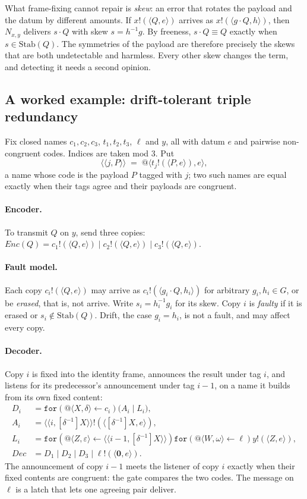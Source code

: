 \documentclass[11pt]{article}
\makeatletter
\theoremstyle{definition}
\theoremstyle{remark}
\newcommand{\nil}{\mathbf{0}}
\newcommand{\rcv}[3]{\mathtt{for}(#1 \leftarrow #2)#3}
\newcommand{\out}[3]{#1!(\langle #2, #3\rangle)}
\newcommand{\qn}[2]{@\langle #1, #2\rangle}
\newcommand{\act}[2]{#1\cdot #2}
\newcommand{\scong}{\equiv}
\newcommand{\Stab}{\mathrm{Stab}}
\newcommand{\fr}[2]{[#1]#2}
\makeatother
\begin{document}
What frame-fixing cannot repair is \emph{skew}: an error that rotates the
payload and the datum by different amounts. If $\out{x}{Q}{e}$ arrives as
$\out{x}{\act{g}{Q}}{h}$, then $N_{x,y}$ delivers $\act{s}{Q}$ with skew
$s=h^{-1}g$. By freeness, $\act{s}{Q}\scong Q$ exactly when $s\in\Stab(Q)$.
The symmetries of the payload are therefore precisely the skews that are
both undetectable and harmless. Every other skew changes the term, and
detecting it needs a second opinion.

\subsection{A worked example: drift-tolerant triple redundancy}

Fix closed names $c_1,c_2,c_3$, $t_1,t_2,t_3$, $\ell$ and $y$, all with datum
$e$ and pairwise non-congruent codes. Indices are taken mod $3$. Put
\[
\langle\!\langle j,P\rangle\!\rangle \;=\; \qn{\out{t_j}{P}{e}}{e},
\]
a name whose code is the payload $P$ tagged with $j$; two such names are
equal exactly when their tags agree and their payloads are congruent.

\paragraph{Encoder.}
To transmit $Q$ on $y$, send three copies:
$\mathit{Enc}(Q)=\out{c_1}{Q}{e}\mid\out{c_2}{Q}{e}\mid\out{c_3}{Q}{e}$.

\paragraph{Fault model.}
Each copy $\out{c_i}{Q}{e}$ may arrive as $\out{c_i}{\act{g_i}{Q}}{h_i}$ for
arbitrary $g_i,h_i\in G$, or be \emph{erased}, that is, not arrive. Write
$s_i=h_i^{-1}g_i$ for its skew. Copy $i$ is \emph{faulty} if it is erased or
$s_i\notin\Stab(Q)$. Drift, the case $g_i=h_i$, is not a fault, and may
affect every copy.

\paragraph{Decoder.}
Copy $i$ is fixed into the identity frame, announces the result under tag
$i$, and listens for its predecessor's announcement under tag $i-1$, on a
name it builds from its own fixed content:
\begin{align*}
D_i &= \rcv{\qn{X}{\delta}}{c_i}{\bigl(A_i\mid L_i\bigr)},\\
A_i &= \out{\langle\!\langle i,\fr{\delta^{-1}}{X}\rangle\!\rangle}
           {\fr{\delta^{-1}}{X}}{e},\\
L_i &= \rcv{\qn{Z}{\varepsilon}}
           {\langle\!\langle i-1,\fr{\delta^{-1}}{X}\rangle\!\rangle}
           {\rcv{\qn{W}{\omega}}{\ell}{\out{y}{Z}{e}}},\\
\mathit{Dec} &= D_1\mid D_2\mid D_3\mid\out{\ell}{\nil}{e}.
\end{align*}
The announcement of copy $i-1$ meets the listener of copy $i$ exactly when
their fixed contents are congruent: the gate compares the two codes. The
message on $\ell$ is a latch that lets one agreeing pair deliver.
\end{document}
